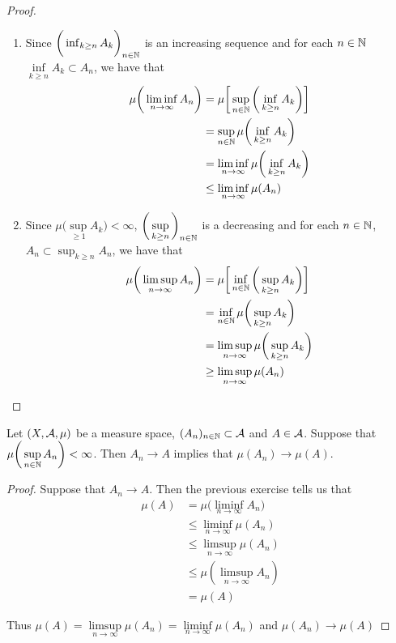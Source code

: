 \documentclass{book}
\begin{document}
	\begin{proof}\
		\begin{enumerate}
			\item Since $\bigg(\inf_{k \geq n}A_k \bigg)_{n \in \mathbb{N}}$ is an increasing sequence and for each $n \in \mathbb{N}$ $\inf\limits_{k \geq n}A_k \subset A_n$, we have that
			\begin{align*}
				\mu\bigg(\liminf\limits_{n \rightarrow \infty} A_n \bigg) 
				& = \mu \bigg[\sup_{n \in \mathbb{N}} \bigg(\inf\limits_{k \geq n} A_k \bigg) \bigg] \\
				&= \sup_{n \in \mathbb{N}}  \mu\bigg( \inf_{k \geq n}A_k\bigg)\\
				& = \liminf_{n \rightarrow \infty} \mu\bigg( \inf_{k \geq n}A_k\bigg) \\
				& \leq \liminf_{n \rightarrow \infty}  \mu(A_n) \\
			\end{align*}
			\item Since $\mu\bigg(\sup\limits_{ \geq 1}A_k \bigg) < \infty$, $\bigg(\sup\limits_{k \geq n} \bigg)_{n \in \mathbb{N}}$ is a decreasing and for each $n \in \mathbb{N}$, $A_n \subset \sup_{k \geq n}A_n$, we have that 
			\begin{align*}
				\mu \bigg(\limsup_{n \rightarrow \infty} A_n 
				\bigg) 
				&= \mu \bigg[\inf_{n \in \mathbb{N}} \bigg(\sup_{k  \geq n} A_k \bigg) \bigg] \\
				&= \inf_{n \in \mathbb{N}}\mu\bigg( \sup_{k \geq n} A_k\bigg) \\
				& = \limsup_{n \rightarrow \infty} \mu \bigg( \sup_{k \geq n}A_k \bigg) \\
				& \geq \limsup_{n \rightarrow \infty} \mu ( A_n )\
			\end{align*} 
		\end{enumerate}
	\end{proof}
	
	\begin{ex} 
		Let $(X, \mathcal{A}, \mu)$ be a measure space, $(A_n)_{n \in \mathbb{N}} \subset \mathcal{A}$ and $A \in \mathcal{A}$. Suppose that $\mu\bigg(\sup\limits_{n \in \mathbb{N}}A_n\bigg) < \infty$. Then $A_n \rightarrow A$ implies that $\mu(A_n) \rightarrow \mu(A)$. 
	\end{ex} 
	
	\begin{proof}
		Suppose that $A_n \rightarrow A$. Then the previous exercise tells us that 
		\begin{align*}
			\mu(A)
			&= \mu\bigg(\liminf\limits_{n \rightarrow \infty}A_n \bigg)\\
			& \leq \liminf_{n \rightarrow \infty} \mu(A_n)\\
			& \leq \limsup_{n \rightarrow \infty}\mu (A_n) \\
			& \leq \mu( \limsup_{n \rightarrow \infty} A_n) \\
			&= \mu (A)
		\end{align*}
		
		Thus $\mu(A) = \limsup\limits_{n \rightarrow \infty}\mu(A_n) = \liminf\limits_{n \rightarrow \infty}\mu(A_n)$ and $\mu(A_n) \rightarrow \mu(A)$
	\end{proof}
	
\end{document}
